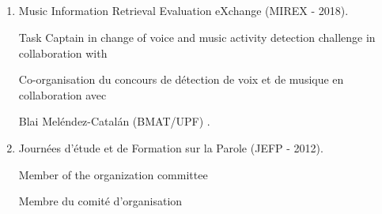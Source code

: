 \subsection{\EvalAnim}
\begin{enumerate}[nosep,after=\strut, leftmargin=1em, itemsep=3pt]
\item Music Information Retrieval Evaluation eXchange (MIREX - 2018).
\begin{en}Task Captain in change of voice and music activity detection challenge in collaboration with\end{en}
\begin{fr}
Co-organisation du concours de détection de voix et de musique en collaboration avec
\end{fr}
Blai Meléndez-Catalán (BMAT/UPF) .
\item Journées d’étude et de Formation sur la Parole (JEFP - 2012).
\begin{en}Member of the organization committee \end{en}
\begin{fr}Membre du comité d'organisation \end{fr}
\end{enumerate}







\section{\PubSec}

